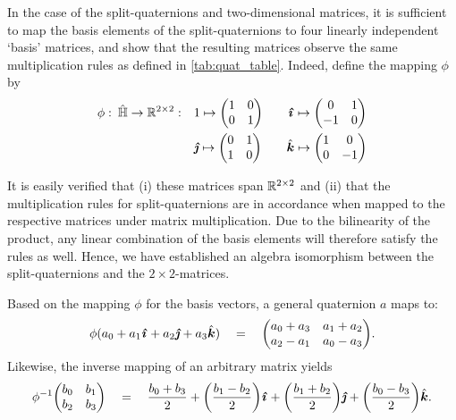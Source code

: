 In the case of the split-quaternions and two-dimensional matrices, it is sufficient to map the basis elements of the split-quaternions to four linearly independent `basis' matrices, and show that the resulting matrices observe the same multiplication rules as defined in \cref{tab:quat_table}. Indeed, define the mapping \(\phi\) by 
\begin{equation}
    \begin{split}
        \phi: \: \spquaternions \to \real^{2\times2}: \quad &  
         1 \mapsto  \mqty(1 & 0 \\ 0 & 1) \qquad
        \quati \mapsto  \mqty(0 & 1 \\  -1 & 0) \\
        & \quatj \mapsto  \mqty(0 & 1 \\  1 & 0)\qquad 
        \quatk \mapsto  \mqty(1 & 0 \\  0 & -1) \\
    \end{split}
    \label{eq:basis_elements}
\end{equation}

It is easily verified that (i) these matrices span \(\mathbb{R}^{2\times2}\) and (ii) that the multiplication rules for split-quaternions are in accordance when mapped to the respective matrices under matrix multiplication. Due to the bilinearity of the product, any linear combination of the basis elements will therefore satisfy the rules as well. Hence, we have established an algebra isomorphism between the split-quaternions and the \(2\times 2\)-matrices. 

Based on the mapping \(\phi\) for the basis vectors, a general quaternion $a$ maps to:
\begin{equation}
    \phi(\quat{a_0}{a_1}{a_2}{a_3}) \quad = \quad \mqty(a_0 + a_3 & a_1 + a_2 \\ a_2 - a_1 & a_0 - a_3). 
    \label{eq:quat_isom}
\end{equation}
Likewise, the inverse mapping of an arbitrary matrix yields
\begin{equation}
    \phi^{-1}\mqty(b_0 & b_1 \\ b_2 & b_3) \quad = \quad \quat{\frac{b_0 + b_3}{2}}{\qty(\frac{b_1 - b_2}{2})}{\qty(\frac{b_1 + b_2}{2})}{\qty(\frac{b_0 - b_3}{2})}. 
    \label{eq:inv_quat_isom}
\end{equation}

